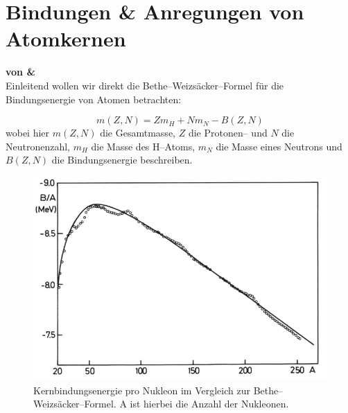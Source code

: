 \documentclass[Ex4_Zusammenfassung.tex]{subfiles}
\begin{document}
\chapter{Bindungen \& Anregungen von Atomkernen}
\textbf{von \martina \& \soeren}\\

Einleitend wollen wir direkt die Bethe--Weizsäcker--Formel für die Bindungsenergie von Atomen betrachten:

\begin{equation}
	m(Z,N) = Z m_H + N m_N - B(Z,N)
\end{equation}
wobei hier $m(Z,N)$ die Gesamtmasse, $Z$ die Protonen-- und $N$ die Neutronenzahl, $m_H$ die Masse des H--Atoms, $m_N$ die Masse eines Neutrons und $B(Z,N)$ die Bindungsenergie beschreiben.

\begin{figure}[h]
	\centering
	\includegraphics[scale=0.5]{bethe-weizsaecker.png}
	\caption{Kernbindungsenergie pro Nukleon im Vergleich zur Bethe--Weizsäcker--Formel. A ist hierbei die Anzahl der Nukleonen.}
\end{figure}
\end{document}
